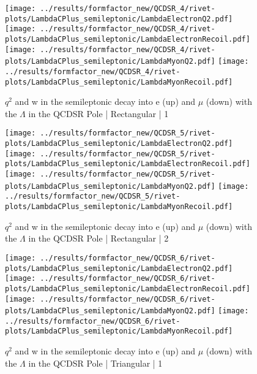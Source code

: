 \begin{figure}[h]
  \centering
  \texttt{[image: ../results/formfactor\_new/QCDSR\_4/rivet-plots/LambdaCPlus\_semileptonic/LambdaElectronQ2.pdf]}
  \texttt{[image: ../results/formfactor\_new/QCDSR\_4/rivet-plots/LambdaCPlus\_semileptonic/LambdaElectronRecoil.pdf]}\\
  \texttt{[image: ../results/formfactor\_new/QCDSR\_4/rivet-plots/LambdaCPlus\_semileptonic/LambdaMyonQ2.pdf]}
  \texttt{[image: ../results/formfactor\_new/QCDSR\_4/rivet-plots/LambdaCPlus\_semileptonic/LambdaMyonRecoil.pdf]}
  \caption{\(q^2\) and w in the semileptonic decay into e (up) and \(\mu\) (down) with the \(\Lambda\) in the QCDSR Pole | Rectangular | 1}
\end{figure}
\begin{figure}[h]
  \centering
  \texttt{[image: ../results/formfactor\_new/QCDSR\_5/rivet-plots/LambdaCPlus\_semileptonic/LambdaElectronQ2.pdf]}
  \texttt{[image: ../results/formfactor\_new/QCDSR\_5/rivet-plots/LambdaCPlus\_semileptonic/LambdaElectronRecoil.pdf]}\\
  \texttt{[image: ../results/formfactor\_new/QCDSR\_5/rivet-plots/LambdaCPlus\_semileptonic/LambdaMyonQ2.pdf]}
  \texttt{[image: ../results/formfactor\_new/QCDSR\_5/rivet-plots/LambdaCPlus\_semileptonic/LambdaMyonRecoil.pdf]}
  \caption{\(q^2\) and w in the semileptonic decay into e (up) and \(\mu\) (down) with the \(\Lambda\) in the QCDSR Pole | Rectangular | 2}
\end{figure}
\begin{figure}[h]
  \centering
  \texttt{[image: ../results/formfactor\_new/QCDSR\_6/rivet-plots/LambdaCPlus\_semileptonic/LambdaElectronQ2.pdf]}
  \texttt{[image: ../results/formfactor\_new/QCDSR\_6/rivet-plots/LambdaCPlus\_semileptonic/LambdaElectronRecoil.pdf]}\\
  \texttt{[image: ../results/formfactor\_new/QCDSR\_6/rivet-plots/LambdaCPlus\_semileptonic/LambdaMyonQ2.pdf]}
  \texttt{[image: ../results/formfactor\_new/QCDSR\_6/rivet-plots/LambdaCPlus\_semileptonic/LambdaMyonRecoil.pdf]}
  \caption{\(q^2\) and w in the semileptonic decay into e (up) and \(\mu\) (down) with the \(\Lambda\) in the QCDSR Pole | Triangular | 1}
\end{figure}
